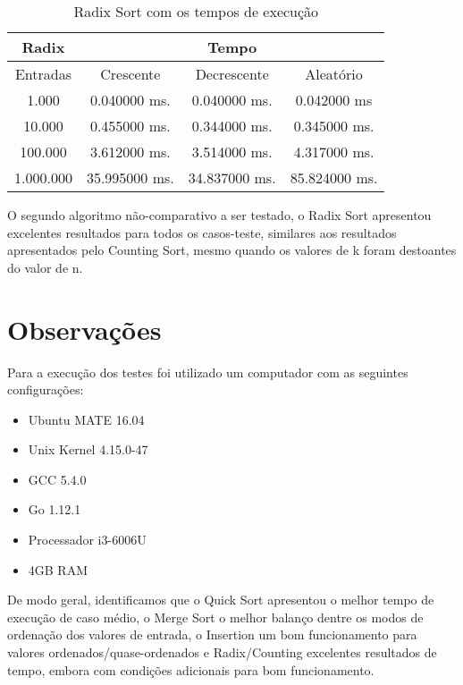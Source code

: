 \documentclass[
	12pt,				%
	openany,
	a4paper,			%
	english,			%
	french,				%
	spanish,			%
	brazil,				%
	]{abntex2}
\begin{document}
    \begin{table}[H]
\centering
\begin{tabular}{|c|c|c|c|}
\hline
Radix & \multicolumn{3}{c|}{Tempo} \\ \hline
Entradas & Crescente & Decrescente & Aleatório \\ \hline
1.000 & 0.040000 ms. & 0.040000 ms. & 0.042000 ms \\ \hline
10.000 & 0.455000 ms. & 0.344000 ms. & 0.345000 ms. \\ \hline
100.000 & 3.612000 ms. & 3.514000 ms. & 4.317000 ms. \\ \hline
1.000.000 & 35.995000 ms. & 34.837000 ms. & 85.824000 ms. \\ \hline
\end{tabular}
\caption{Radix Sort com os tempos de execução}
\label{tab:radix}
\end{table}
    
    
    O segundo algoritmo não-comparativo a ser testado, o Radix Sort apresentou excelentes resultados para todos os casos-teste, similares aos resultados apresentados pelo Counting Sort, mesmo quando os valores de k foram destoantes do valor de n.
    
    
\chapter {Observações} %

Para a execução dos testes foi utilizado um computador com as seguintes configurações:
\begin{itemize}
    \item Ubuntu MATE 16.04
    \item Unix Kernel 4.15.0-47
    \item GCC 5.4.0
    \item Go 1.12.1
    \item Processador i3-6006U
    \item 4GB RAM
\end{itemize}

De modo geral, identificamos que o Quick Sort apresentou o melhor tempo de execução de caso médio, o Merge Sort o melhor balanço dentre os modos de ordenação dos valores de entrada, o Insertion um bom funcionamento para valores ordenados/quase-ordenados e Radix/Counting excelentes resultados de tempo, embora com condições adicionais para bom funcionamento.
\end{document}
